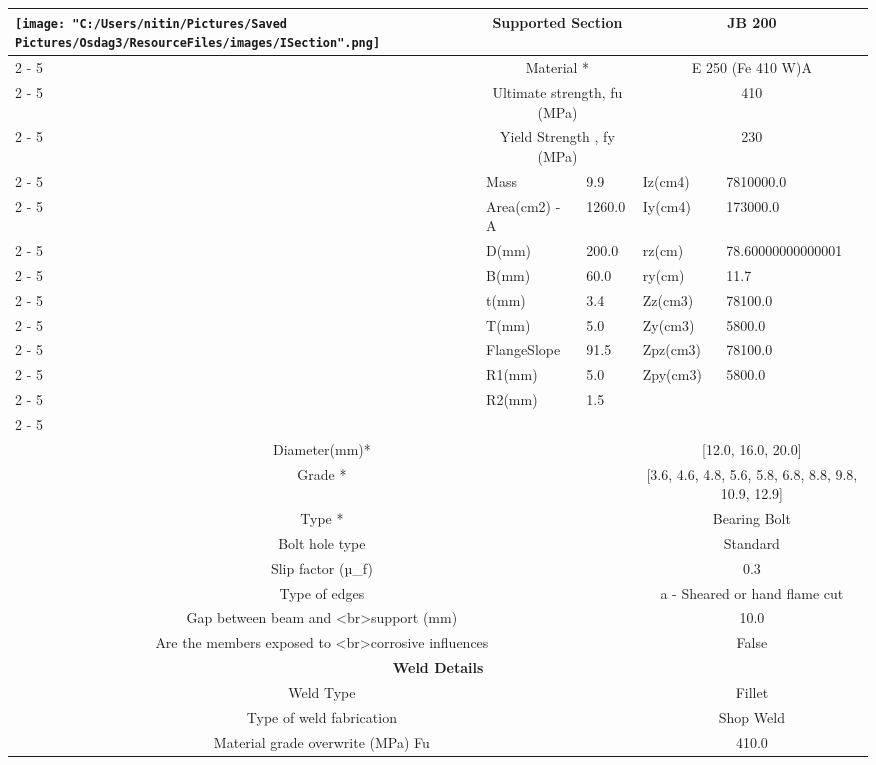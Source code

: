 \documentclass{article}%
\begin{document}
\begin{longtable}{|p{5cm}|p{2cm}|p{2cm}|p{2cm}|p{5cm}|}
\multirow{13}{*}{\texttt{[image: "C:/Users/nitin/Pictures/Saved Pictures/Osdag3/ResourceFiles/images/ISection".png]}}&\multicolumn{2}{|c|}{Supported Section}&\multicolumn{2}{|c|}{JB 200}\\%
\cline{2%
-%
5}%
&\multicolumn{2}{|c|}{Material *}&\multicolumn{2}{|c|}{E 250 (Fe 410 W)A}\\%
\cline{2%
-%
5}%
&\multicolumn{2}{|c|}{Ultimate strength, fu (MPa)}&\multicolumn{2}{|c|}{410}\\%
\cline{2%
-%
5}%
&\multicolumn{2}{|c|}{Yield Strength , fy (MPa)}&\multicolumn{2}{|c|}{230}\\%
\cline{2%
-%
5}%
&Mass&9.9&Iz(cm4)&7810000.0\\%
\cline{2%
-%
5}%
&Area(cm2) {-} A&1260.0&Iy(cm4)&173000.0\\%
\cline{2%
-%
5}%
&D(mm)&200.0&rz(cm)&78.60000000000001\\%
\cline{2%
-%
5}%
&B(mm)&60.0&ry(cm)&11.7\\%
\cline{2%
-%
5}%
&t(mm)&3.4&Zz(cm3)&78100.0\\%
\cline{2%
-%
5}%
&T(mm)&5.0&Zy(cm3)&5800.0\\%
\cline{2%
-%
5}%
&FlangeSlope&91.5&Zpz(cm3)&78100.0\\%
\cline{2%
-%
5}%
&R1(mm)&5.0&Zpy(cm3)&5800.0\\%
\cline{2%
-%
5}%
&R2(mm)&1.5&&\\%
\cline{2%
-%
5}%
\hline%
\multicolumn{5}{|c|}{\textbf{Bolt Details}}\\%
\hline%
\hline%
\multicolumn{3}{|c|}{Diameter(mm)*}&\multicolumn{2}{|c|}{{[}12.0, 16.0, 20.0{]}}\\%
\hline%
\hline%
\multicolumn{3}{|c|}{Grade *}&\multicolumn{2}{|c|}{{[}3.6, 4.6, 4.8, 5.6, 5.8, 6.8, 8.8, 9.8, 10.9, 12.9{]}}\\%
\hline%
\hline%
\multicolumn{3}{|c|}{Type *}&\multicolumn{2}{|c|}{Bearing Bolt}\\%
\hline%
\hline%
\multicolumn{3}{|c|}{Bolt hole type}&\multicolumn{2}{|c|}{Standard}\\%
\hline%
\hline%
\multicolumn{3}{|c|}{Slip factor (µ\_f)}&\multicolumn{2}{|c|}{0.3}\\%
\hline%
\hline%
\multicolumn{3}{|c|}{Type of edges}&\multicolumn{2}{|c|}{a {-} Sheared or hand flame cut}\\%
\hline%
\hline%
\multicolumn{3}{|c|}{Gap between beam and <br>support (mm)}&\multicolumn{2}{|c|}{10.0}\\%
\hline%
\hline%
\multicolumn{3}{|c|}{Are the members exposed to <br>corrosive influences}&\multicolumn{2}{|c|}{False}\\%
\hline%
\hline%
\multicolumn{5}{|c|}{\textbf{Weld Details}}\\%
\hline%
\hline%
\multicolumn{3}{|c|}{Weld Type}&\multicolumn{2}{|c|}{Fillet}\\%
\hline%
\hline%
\multicolumn{3}{|c|}{Type of weld fabrication}&\multicolumn{2}{|c|}{Shop Weld}\\%
\hline%
\hline%
\multicolumn{3}{|c|}{Material grade overwrite (MPa) Fu}&\multicolumn{2}{|c|}{410.0}\\%
\hline%
\end{longtable}
\end{document}
